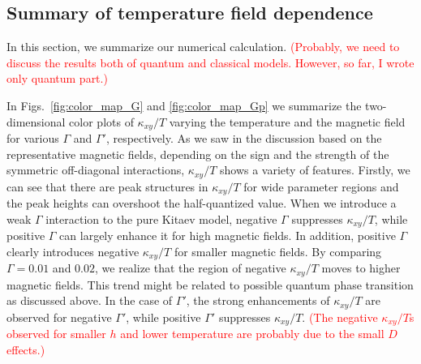 \documentclass[reprint,amsmath,amssymb,aps,prx]{revtex4-2}
\begin{document}

  \subsection{Summary of temperature field dependence}
In this section, we summarize our numerical calculation. \textcolor{red}{(Probably, we need to discuss the results both of quantum and classical models. However, so far, I wrote only quantum part.)}

In Figs.~\ref{fig:color_map_G} and \ref{fig:color_map_Gp} we summarize the two-dimensional color plots of $\kappa_{xy}/T$ varying the temperature and the magnetic field for various $\Gamma$ and $\Gamma'$, respectively. As we saw in the discussion based on the representative magnetic fields, depending on the sign and the strength of the symmetric off-diagonal interactions, $\kappa_{xy}/T$ shows a variety of features. Firstly, we can see that there are peak structures in $\kappa_{xy}/T$ for wide parameter regions and the peak heights can overshoot the half-quantized value. When we introduce a weak $\Gamma$ interaction to the pure Kitaev model, negative $\Gamma$ suppresses $\kappa_{xy}/T$, while positive $\Gamma$ can largely enhance it for high magnetic fields. In addition, positive $\Gamma$ clearly introduces negative $\kappa_{xy}/T$ for smaller magnetic fields. By comparing $\Gamma = 0.01$ and $0.02$, we realize that the region of negative $\kappa_{xy}/T$ moves to higher magnetic fields. This trend might be related to possible quantum phase transition as discussed above. In the case of $\Gamma'$, the strong enhancements of $\kappa_{xy}/T$ are observed for negative $\Gamma'$, while positive $\Gamma'$ suppresses $\kappa_{xy}/T$. \textcolor{red}{(The negative $\kappa_{xy}/T$s observed for smaller $h$ and lower temperature are probably due to the small $D$ effects.)}
\end{document}
